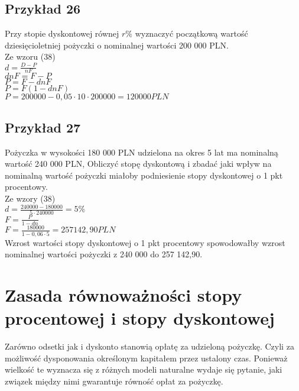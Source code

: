 \documentclass{article}
\begin{document}
\subsection{Przykład 26}
Przy stopie dyskontowej równej $ r\% $ wyznaczyć początkową wartość dziesięcioletniej pożyczki o nominalnej wartości 200 000 PLN.\\

Ze wzoru (38)\\

$ d = \frac{D - P}{nF} $\\

$ dnF = F - P $\\

$ P = F - dnF $\\

$ P = F(1 - dnF) $\\

$ P = 200 000 - 0,05 \cdot 10 \cdot 200 000 = 120 000 PLN $

\subsection{Przykład 27}
Pożyczka w wysokości 180 000 PLN udzielona na okres 5 lat ma nominalną wartość 240 000 PLN, Obliczyć stopę dyskontową i zbadać jaki wpływ na nominalną wartość pożyczki miałoby podniesienie stopy dyskontowej o 1 pkt procentowy.\\

Ze wzory (38)\\

$ d = \frac{240 000 - 180 000}{5 \cdot 240 000} = 5\% $\\

$ F = \frac{P}{1 - dn} $\\

$ F = \frac{180 000}{1 - 0,06 \cdot 5} = 257 142,90 PLN $\\

Wzrost wartości stopy dyskontowej o 1 pkt procentowy spowodowałby wzrost nominalnej wartości pożyczki z 240 000 do 257 142,90.\\

\newpage

%
%

\section{Zasada równoważności stopy procentowej i stopy dyskontowej}
Zarówno odsetki jak i dyskonto stanowią opłatę za udzieloną pożyczkę. Czyli za możliwość dysponowania określonym kapitałem przez ustalony czas. Ponieważ wielkość te wyznacza się z różnych modeli naturalne wydaje się pytanie, jaki związek między nimi gwarantuje równość opłat za pożyczkę.\\
\end{document}

